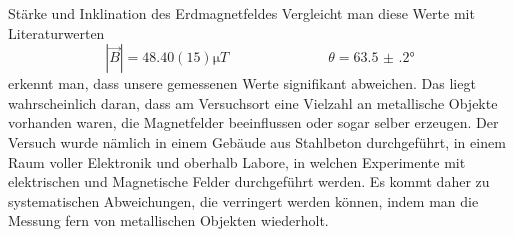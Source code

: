 \documentclass{alex_gp}
\begin{document}
\begin{mybox}{Stärke und Inklination des Erdmagnetfeldes}
	Vergleicht man diese Werte mit Literaturwerten \footnotemark[1]
	\begin{equation}\label{key}
		|\vec{B}| = 48.40(15) \unit{\micro T} \hspace{3cm} \theta = \ang{63.5(2)}
	\end{equation}
	erkennt man, dass unsere gemessenen Werte signifikant abweichen. Das liegt wahrscheinlich daran, dass am Versuchsort eine Vielzahl an metallische Objekte vorhanden waren, die Magnetfelder beeinflussen oder sogar selber erzeugen. Der Versuch wurde nämlich in einem Gebäude aus Stahlbeton durchgeführt, in einem Raum voller Elektronik und oberhalb Labore, in welchen Experimente mit elektrischen und Magnetische Felder durchgeführt werden. Es kommt daher zu systematischen Abweichungen, die verringert werden können, indem man die Messung fern von metallischen Objekten wiederholt.

\end{mybox}
\end{document}
